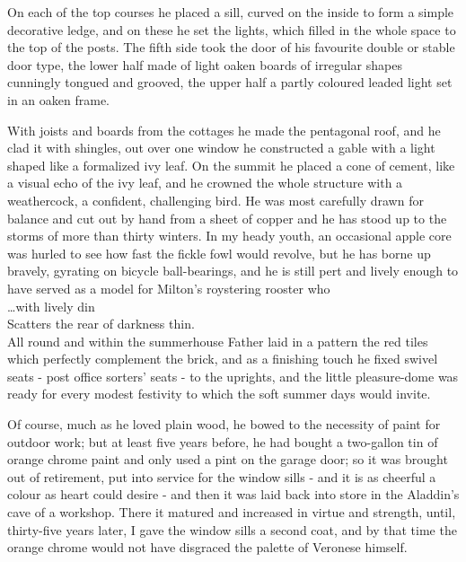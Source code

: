 On each of the top courses he placed a sill, curved on the inside to form a simple decorative ledge, and on these he set the lights, which filled in the whole space to the top of the posts. The fifth side took the door of his favourite double or stable door type, the lower half made of light oaken boards of irregular shapes cunningly tongued and grooved, the upper half a partly coloured leaded light set in an oaken frame.

With joists and boards from the cottages he made the pentagonal roof, and he clad it with shingles, out over one window he constructed a gable with a light shaped like a formalized ivy leaf. On the summit he placed a cone of cement, like a visual echo of the ivy leaf, and he crowned the whole structure with a weathercock, a confident, challenging bird. He was most carefully drawn for balance and cut out by hand from a sheet of copper and he has stood up to the storms of more than thirty winters. In my heady youth, an occasional apple core was hurled to see how fast the fickle fowl would revolve, but he has borne up bravely, gyrating on bicycle ball-bearings, and he is still pert and lively enough to have served as a model for Milton's roystering rooster who \\
…with lively din \\
Scatters the rear of darkness thin.\\

All round and within the summerhouse Father laid in a pattern the red tiles which perfectly complement the brick, and as a finishing touch he fixed swivel seats - post office sorters' seats - to the uprights, and the little pleasure-dome was ready for every modest festivity to which the soft summer days would invite.

Of course, much as he loved plain wood, he bowed to the necessity of paint for outdoor work; but at least five years before, he had bought a two-gallon tin of orange chrome paint and only used a pint on the garage door; so it was brought out of retirement, put into service for the window sills - and it is as cheerful a colour as heart could desire - and then it was laid back into store in the Aladdin's cave of a workshop. There it matured and increased in virtue and strength, until, thirty-five years later, I gave the window sills a second coat, and by that time the orange chrome would not have disgraced the palette of Veronese himself.